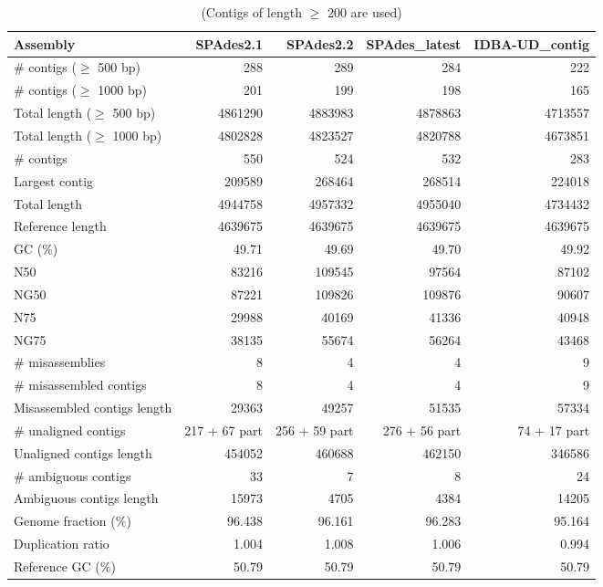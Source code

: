 \begin{table}[ht]
\begin{center}
\caption{(Contigs of length $\geq$ 200 are used)}
\begin{tabular}{|l*{4}{|r}|}
\hline
Assembly & SPAdes2.1 & SPAdes2.2 & SPAdes\_latest & IDBA-UD\_contig \\ \hline
\# contigs ($\geq$ 500 bp) & 288 & 289 & 284 & 222 \\ \hline
\# contigs ($\geq$ 1000 bp) & 201 & 199 & 198 & 165 \\ \hline
Total length ($\geq$ 500 bp) & 4861290 & 4883983 & 4878863 & 4713557 \\ \hline
Total length ($\geq$ 1000 bp) & 4802828 & 4823527 & 4820788 & 4673851 \\ \hline
\# contigs & 550 & 524 & 532 & 283 \\ \hline
Largest contig & 209589 & 268464 & 268514 & 224018 \\ \hline
Total length & 4944758 & 4957332 & 4955040 & 4734432 \\ \hline
Reference length & 4639675 & 4639675 & 4639675 & 4639675 \\ \hline
GC (\%) & 49.71 & 49.69 & 49.70 & 49.92 \\ \hline
N50 & 83216 & 109545 & 97564 & 87102 \\ \hline
NG50 & 87221 & 109826 & 109876 & 90607 \\ \hline
N75 & 29988 & 40169 & 41336 & 40948 \\ \hline
NG75 & 38135 & 55674 & 56264 & 43468 \\ \hline
\# misassemblies & 8 & 4 & 4 & 9 \\ \hline
\# misassembled contigs & 8 & 4 & 4 & 9 \\ \hline
Misassembled contigs length & 29363 & 49257 & 51535 & 57334 \\ \hline
\# unaligned contigs & 217 + 67 part & 256 + 59 part & 276 + 56 part & 74 + 17 part \\ \hline
Unaligned contigs length & 454052 & 460688 & 462150 & 346586 \\ \hline
\# ambiguous contigs & 33 & 7 & 8 & 24 \\ \hline
Ambiguous contigs length & 15973 & 4705 & 4384 & 14205 \\ \hline
Genome fraction (\%) & 96.438 & 96.161 & 96.283 & 95.164 \\ \hline
Duplication ratio & 1.004 & 1.008 & 1.006 & 0.994 \\ \hline
Reference GC (\%) & 50.79 & 50.79 & 50.79 & 50.79 \\ \hline

\end{tabular}
\end{center}
\end{table}
